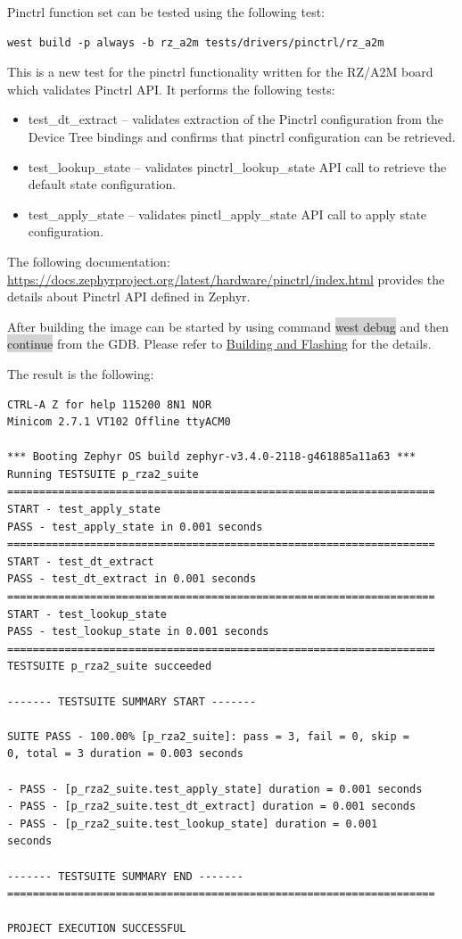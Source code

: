 \documentclass[11pt,a4paper,oneside]{article}
\begin{document}
Pinctrl function set can be tested using the following test:

\begin{lstlisting}
west build -p always -b rz_a2m tests/drivers/pinctrl/rz_a2m
\end{lstlisting}

This is a new test for the pinctrl functionality written for the RZ/A2M
board which validates Pinctrl API. It performs the following tests:

\begin{itemize}
\item
  test\_dt\_extract -- validates extraction of the Pinctrl configuration
  from the Device Tree bindings and confirms that pinctrl configuration
  can be retrieved.
\item
  test\_lookup\_state -- validates pinctrl\_lookup\_state API call to
  retrieve the default state configuration.
\item
  test\_apply\_state -- validates pinctl\_apply\_state API call to apply
  state configuration.
\end{itemize}

The following documentation:
\url{https://docs.zephyrproject.org/latest/hardware/pinctrl/index.html}
provides the details about Pinctrl API defined in Zephyr.

After building the image can be started by using command \colorbox{lightgray}{west debug}
and then \colorbox{lightgray}{continue} from the GDB. Please refer to
\hyperref[building-and-flashing]{Building and Flashing} for the
details.

The result is the following:

\begin{lstlisting}
CTRL-A Z for help 115200 8N1 NOR
Minicom 2.7.1 VT102 Offline ttyACM0

*** Booting Zephyr OS build zephyr-v3.4.0-2118-g461885a11a63 ***
Running TESTSUITE p_rza2_suite
===================================================================
START - test_apply_state
PASS - test_apply_state in 0.001 seconds
===================================================================
START - test_dt_extract
PASS - test_dt_extract in 0.001 seconds
===================================================================
START - test_lookup_state
PASS - test_lookup_state in 0.001 seconds
===================================================================
TESTSUITE p_rza2_suite succeeded

------- TESTSUITE SUMMARY START -------

SUITE PASS - 100.00% [p_rza2_suite]: pass = 3, fail = 0, skip =
0, total = 3 duration = 0.003 seconds

- PASS - [p_rza2_suite.test_apply_state] duration = 0.001 seconds
- PASS - [p_rza2_suite.test_dt_extract] duration = 0.001 seconds
- PASS - [p_rza2_suite.test_lookup_state] duration = 0.001
seconds

------- TESTSUITE SUMMARY END -------
===================================================================

PROJECT EXECUTION SUCCESSFUL
\end{lstlisting}
\end{document}
